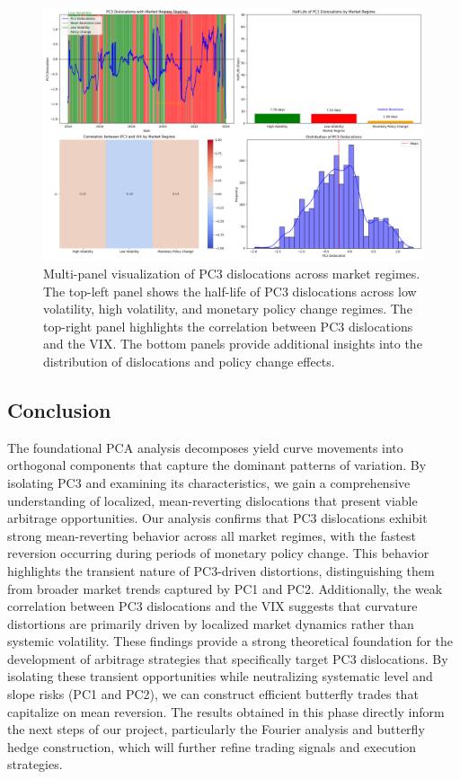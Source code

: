 \documentclass[12pt]{article}
\begin{document}
\begin{figure}[H]
    \centering
    \includegraphics[width=\textwidth]{visuals/multi_panel_plot.png}
    \caption{Multi-panel visualization of PC3 dislocations across market regimes. The top-left panel shows the half-life of PC3 dislocations across low volatility, high volatility, and monetary policy change regimes. The top-right panel highlights the correlation between PC3 dislocations and the VIX. The bottom panels provide additional insights into the distribution of dislocations and policy change effects.}
    \label{fig:multi_panel}
\end{figure}

\subsection{Conclusion}

The foundational PCA analysis decomposes yield curve movements into orthogonal components that capture the dominant patterns of variation. By isolating PC3 and examining its characteristics, we gain a comprehensive understanding of localized, mean-reverting dislocations that present viable arbitrage opportunities. Our analysis confirms that PC3 dislocations exhibit strong mean-reverting behavior across all market regimes, with the fastest reversion occurring during periods of monetary policy change. This behavior highlights the transient nature of PC3-driven distortions, distinguishing them from broader market trends captured by PC1 and PC2. Additionally, the weak correlation between PC3 dislocations and the VIX suggests that curvature distortions are primarily driven by localized market dynamics rather than systemic volatility. These findings provide a strong theoretical foundation for the development of arbitrage strategies that specifically target PC3 dislocations. By isolating these transient opportunities while neutralizing systematic level and slope risks (PC1 and PC2), we can construct efficient butterfly trades that capitalize on mean reversion. The results obtained in this phase directly inform the next steps of our project, particularly the Fourier analysis and butterfly hedge construction, which will further refine trading signals and execution strategies.
\end{document}
